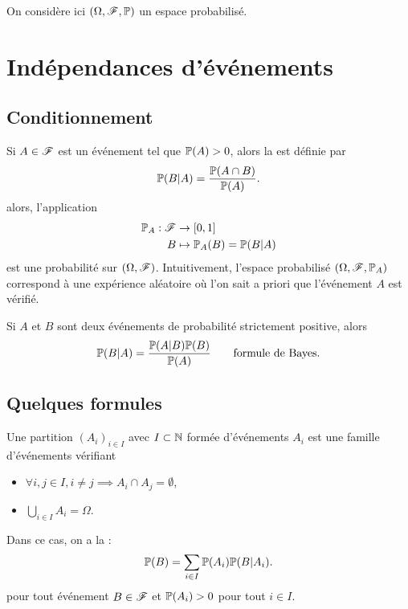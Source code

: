 On considère ici \((\Omega, \mathscr{F}, \mathbb{P})\) un espace probabilisé.

\section{Indépendances d'événements} %

\subsection{Conditionnement} %

Si \(A\in\mathscr{F}\) est un événement tel que \(\mathbb{P}(A)>0\), alors
la 
est définie par
\begin{equation*}
    \mathbb{P}(B|A) = \frac{\mathbb{P}(A\cap B)}{\mathbb{P}(A)}.
\end{equation*}
alors, l'application
\begin{equation*}
    \begin{aligned}
        \mathbb{P}_A:\mathscr{F} & \to \mathopen{}\left[0,1\right]\mathclose{} \\
        B & \mapsto \mathbb{P}_A(B) = \mathbb{P}(B|A)
    \end{aligned}
\end{equation*}
est une probabilité sur \((\Omega, \mathscr{F})\). Intuitivement, 
l'espace probabilisé \((\Omega, \mathscr{F}, \mathbb{P}_A)\) correspond à
une expérience aléatoire où l'on sait a priori que l'événement \(A\) est vérifié.

Si \(A\) et \(B\) sont deux événements de probabilité strictement positive, alors
\begin{equation*}
    \mathbb{P}(B|A) = \frac{\mathbb{P}(A|B)\mathbb{P}(B)}{\mathbb{P}(A)} \qquad \text{formule de Bayes}.
\end{equation*}

\subsection{Quelques formules} %

Une partition \({(A_i)}_{i\in I}\) avec \(I\subset\mathbb{N}\) formée d'événements
\(A_i\) est une famille d'événements vérifiant
\begin{itemize}
    \item \(\forall i,j\in I, i\neq j \implies A_i\cap A_j = \emptyset\),
    \item \(\bigcup_{i\in I} A_i = \Omega\).
\end{itemize}
Dans ce cas, on a la :
\begin{equation*}
    \mathbb{P}(B) = \sum_{i\in I} \mathbb{P}(A_i)\mathbb{P}(B|A_i).
\end{equation*}
pour tout événement \(B\in\mathscr{F}\) et \(\mathbb{P}(A_i)>0\) pour tout \(i\in I\).

